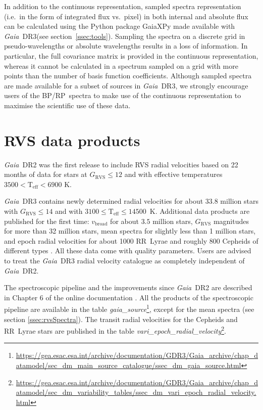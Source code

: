 \documentclass[longauth]{aa}
\makeatletter
\providecommand{\teff}{\ensuremath{{\mathrm{T_{eff}}}}\xspace}
\providecommand{\vbroad}{\ensuremath{v_\mathrm{broad}}\xspace}
\providecommand{\bprp}{BP/RP\xspace}
\providecommand\grvs{\ensuremath{G_\mathrm{RVS}}\xspace}
\providecommand\gdrtwo{\textit{Gaia}~DR2\xspace}
\providecommand\gdrthree{\textit{Gaia}~DR3\xspace}
\providecommand\gdr[1]{\textit{Gaia}~DR#1\xspace}
\providecommand{\linktodoc}{https://gea.esac.esa.int/archive/documentation/GDR3}
\providecommand{\gstable}[1]{\url{\linktodoc/Gaia_archive/chap_datamodel/sec_dm_main_source_catalogue/ssec_dm_#1.html}}%
\providecommand{\varitable}[1]{\url{\linktodoc/Gaia_archive/chap_datamodel/sec_dm_variability_tables/ssec_dm_#1.html}}%
\DeclareRobustCommand*{\fieldName}[1]{%
  \begingroup\@fieldName\scantokens{\texttt{\small {#1}}\noexpand}\endgroup}
\makeatother
\begin{document}
In addition to the continuous representation,  sampled  spectra representation (i.e.\ in the form of integrated flux vs.\ pixel)  in both internal and absolute flux can be calculated  using the Python package GaiaXPy  made available with \gdrthree (see section~\ref{ssec:tools}). Sampling the spectra on a discrete grid in pseudo-wavelengths or absolute wavelengths results in a loss of information. In particular, the full covariance matrix is provided in the continuous representation, whereas it cannot be calculated in a spectrum sampled  on a grid with more points than the number of basis function coefficients. Although sampled spectra are made available for a subset of sources in \gdr{3}, we strongly encourage users of the \bprp\ spectra to make use of the continuous representation to  maximise the scientific use of these data.




\section{RVS data products}\label{ssec:vrad}

\gdrtwo was the first release to include RVS radial velocities based on 22 months of data for stars at $\grvs \le 12$ and with effective temperatures $3500 < \teff < 6900 $ K.  

\gdrthree contains newly determined radial velocities for about $33.8$ million stars with $\grvs \le 14$ and with  $3100 \le \teff \le 14500$~K. Additional data products  are published for the first time: \vbroad for about $3.5$ million stars, \grvs magnitudes for more than 32 million stars, mean spectra for slightly less than 1 million stars, and epoch radial velocities  for about 1000 RR~Lyrae and roughly 800 Cepheids of different types \citep{DR3-DPACP-169}.
All these data come with quality parameters.
Users are advised to  treat the \gdrthree radial velocity catalogue as completely independent of \gdrtwo.

The spectroscopic pipeline and the improvements since \gdrtwo are described in Chapter 6 of the online documentation  \citep{CU6-DR3-documentation}. All the products of the spectroscopic pipeline are available in the table  \textit{gaia\_source}\footnote{\gstable{gaia_source}}, 
except  for the mean spectra (see  section \ref{ssec:rvsSpectra}).
The transit radial velocities for the Cepheids and RR~Lyrae stars are published in the table \textit{vari\_epoch\_radial\_velocity}\footnote{\varitable{vari_epoch_radial_velocity}}.
\end{document}
